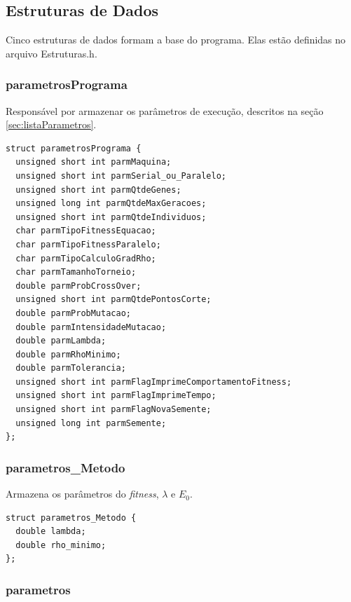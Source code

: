 \subsection{Estruturas de Dados}

	Cinco estruturas de dados formam a base do programa. Elas estão definidas no arquivo Estruturas.h.
	
\subsubsection{parametrosPrograma}

	Responsável por armazenar os parâmetros de execução, descritos na seção \ref{sec:listaParametros}.
	

\vspace{1 cm}	
\begin{lstlisting}
struct parametrosPrograma {
  unsigned short int parmMaquina;
  unsigned short int parmSerial_ou_Paralelo;
  unsigned short int parmQtdeGenes;
  unsigned long int parmQtdeMaxGeracoes;
  unsigned short int parmQtdeIndividuos;
  char parmTipoFitnessEquacao;
  char parmTipoFitnessParalelo;
  char parmTipoCalculoGradRho;
  char parmTamanhoTorneio;
  double parmProbCrossOver;
  unsigned short int parmQtdePontosCorte;
  double parmProbMutacao;
  double parmIntensidadeMutacao;
  double parmLambda;
  double parmRhoMinimo;
  double parmTolerancia;
  unsigned short int parmFlagImprimeComportamentoFitness;
  unsigned short int parmFlagImprimeTempo;
  unsigned short int parmFlagNovaSemente;
  unsigned long int parmSemente;
};
\end{lstlisting}
\vspace{1 cm}

\subsubsection{parametros\_Metodo}

	Armazena os parâmetros do \emph{fitness}, $\lambda$ e $E_0$.


\vspace{1 cm}	
\begin{lstlisting}
struct parametros_Metodo {
  double lambda;
  double rho_minimo;
};
\end{lstlisting}
\vspace{1 cm}

\subsubsection{parametros}
	
